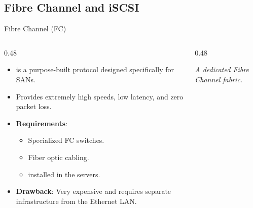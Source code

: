 \documentclass[aspectratio=169]{beamer}  %
\begin{document}
\subsection{Fibre Channel and iSCSI}
\begin{frame}[t]{Fibre Channel (FC)}
    \begin{columns}[T]
        \begin{column}{0.48\textwidth}
            \begin{itemize}
                \item {} is a purpose-built protocol designed specifically for SANs.
                \item Provides extremely high speeds, low latency, and zero packet loss.
                \item \textbf{Requirements}:
                \begin{itemize}
                    \footnotesize
                    \item Specialized FC switches.
                    \item Fiber optic cabling.
                    \item {} installed in the servers.
                \end{itemize}
                \item \textbf{Drawback}: Very expensive and requires separate infrastructure from the Ethernet LAN.
            \end{itemize}
        \end{column}
        \begin{column}{0.48\textwidth}
            \begin{center}
                \par\tiny\textit{A dedicated Fibre Channel fabric.}
            \end{center}
        \end{column}
    \end{columns}
\end{frame}
\end{document}
